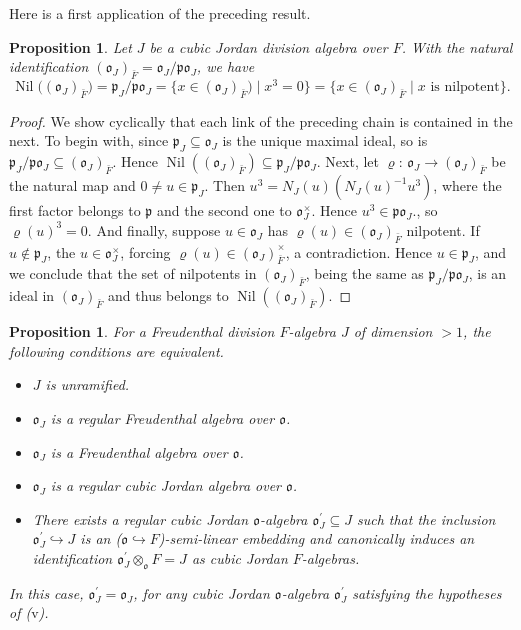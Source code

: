 \documentclass{amsart}
\newtheorem{prop}[equation]{Proposition}
\theoremstyle{definition} %
\theoremstyle{remark} %
\DeclareMathOperator{\Nil}{Nil}
\newcommand{\mfo}{\mathfrak{o}}
\newcommand{\mfp}{\mathfrak{p}}
\renewcommand{\:}{\colon\,}
\numberwithin{equation}{section}
\begin{document}
Here is a first application of the preceding result.

\begin{prop} \label{p.NILOJA}
Let $J$ be a cubic Jordan division algebra over $F$. With the natural identification $(\mfo_J)_{\bar F} = \mfo_J/\mfp\mfo_J$, we have	
\[
\Nil\big((\mfo_J)_{\bar F}\big) =\mfp_J/\mfp\mfo_J = \{x \in (\mfo_J)_{\bar F}) \mid x^3 = 0\} = \{x \in (\mfo_J)_{\bar F} \mid \text{$x$ is nilpotent}\}. 
\]
\end{prop}

\begin{proof}
We show cyclically that each link of the preceding chain is contained in the next. To begin with,  since $\mfp_J \subseteq \mfo_J$ is the unique maximal ideal, so is $\mfp_J/\mfp\mfo_J \subseteq (\mfo_J)_{\bar F}$. Hence $\Nil((\mfo_J)_{\bar F}) \subseteq \mfp_J/\mfp\mfo_J$. Next, let $\varrho\:\mfo_J \to (\mfo_J)_{\bar F}$ be the natural map and $0 \ne u \in \mfp_J$. Then $u^3 = N_J(u)(N_J(u)^{-1}u^3)$, where the first factor belongs to $\mfp$ and the second one to $\mfo_J^\times$. Hence $u^3 \in \mfp\mfo_J$., so $\varrho(u)^3 = 0$. And finally, suppose $u \in \mfo_J$ has $\varrho(u) \in (\mfo_J)_{\bar F}$ nilpotent. If $u \notin \mfp_J$, the $u \in \mfo_J^\times$, forcing $\varrho(u) \in (\mfo_J)_{\bar F}^\times$, a contradiction. Hence $u \in \mfp_J$, and we conclude that the set of nilpotents in $(\mfo_J)_{\bar F}$, being the same as $\mfp_J/\mfp\mfo_J$, is an ideal in $(\mfo_J)_{\bar F}$ and thus belongs to $\Nil((\mfo_J)_{\bar F})$.
\end{proof}
	
\begin{prop} \label{p.CHAUNR}
For a Freudenthal division $F$-algebra $J$ of dimension $> 1$, the following conditions are equivalent.
\begin{itemize}
\item [(i)] $J$ is unramified.

\item [(ii)] $\mfo_J$ is a regular Freudenthal algebra over $\mfo$.

\item [(iii)] $\mfo_J$ is a Freudenthal algebra over $\mfo$.

\item [(iv)] $\mfo_J$ is a regular cubic Jordan algebra over $\mfo$.

\item [(v)] There exists a regular cubic Jordan $\mfo$-algebra $\mfo_J^\prime \subseteq J$ such that the inclusion $\mfo_J^\prime \hookrightarrow J$ is an ($\mfo \hookrightarrow F$)-semi-linear embedding and canonically induces an identification $\mfo_J^\prime \otimes_{\mfo} F = J$ as cubic Jordan $F$-algebras.
\end{itemize}
In this case, $\mfo_J^\prime = \mfo_J$, for any cubic Jordan $\mfo$-algebra $\mfo_J^\prime$ satisfying the hypotheses of ($\mathrm{v}$). 
\end{prop}
\end{document}
